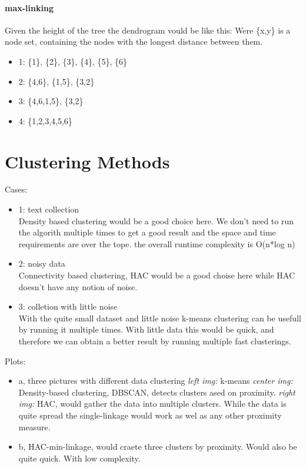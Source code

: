 \documentclass[12pt, a4paper]{article}
\begin{document}
\paragraph{max-linking}
Given the height of the tree the dendrogram vould be like this:
Were \{x,y\} is a node set, containing the nodes with the longest distance between them.
\begin{itemize}
    \item 1: \{1\}, \{2\}, \{3\}, \{4\}, \{5\}, \{6\}
    \item 2: \{4,6\}, \{1,5\}, \{3,2\}
    \item 3: \{4,6,1,5\}, \{3,2\}
    \item 4: \{1,2,3,4,5,6\}
\end{itemize}

\section{Clustering Methods}
Cases:
\begin{itemize}
	\item 1: text collection \\ Density based clustering would be a good choice here. We don't need to run the algorith multiple times to get a good result and the space and time requirements are over the tope. the overall runtime complexity is O(n*log n)
	\item 2: noisy data \\ Connectivity based clustering, HAC would be a good choise here while HAC doesn't have any notion of noise. 
	\item 3: colletion with little noise \\ With the quite small dataset and little noise k-means clustering can be usefull by running it multiple times. With little data this would be quick, and therefore we can obtain a better result by running multiple fast clusterings. 
\end{itemize}

Plots:
\begin{itemize}
    \item a, three pictures with different data clustering
		\subitem \textit{left img:} k-means
		\subitem \textit{center img:} Density-based clustering, DBSCAN, detects clusters ased on proximity.
		\subitem \textit{right img:} HAC, would gather the data into multiple clusters. While the data is quite spread the single-linkage would work as wel as any other proximity measure. 
    \item b, HAC-min-linkage, would craete three clusters by proximity. Would also be quite quick. With low complexity. 
\end{itemize}
\end{document}
